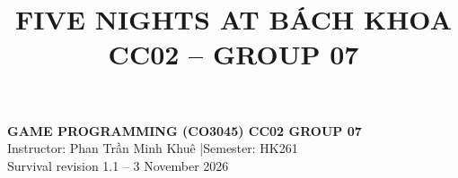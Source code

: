 \documentclass[oneside,final]{hcmut-report}
\title{FIVE NIGHTS AT BÁCH KHOA\\[2mm]\small CC02 -- GROUP 07}
\begin{document}
\coverpage
\begin{center}
 {\large\bfseries\color{navy}GAME PROGRAMMING (CO3045) \textendash{} CC02 \textendash{} GROUP 07}\\[3pt]
 {\small\color{slate}Instructor: Phan Trần Minh Khuê \quad|\quad Semester: HK261\\ Survival revision 1.1 -- 3 November 2026}
\end{center}

\tableofcontents
\clearpage

\end{document}

